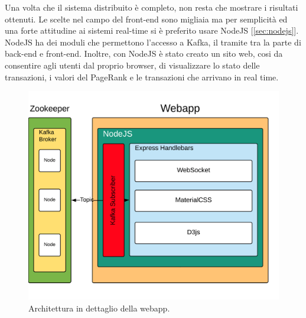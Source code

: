 Una volta che il sistema distribuito è completo, non resta che mostrare i risultati ottenuti. Le scelte nel campo del front-end sono migliaia ma per semplicità ed una forte attitudine ai sistemi real-time si è preferito usare NodeJS [\ref{sec:nodejs}]. NodeJS ha dei moduli che permettono l'accesso a Kafka, il tramite tra la parte di back-end e front-end. Inoltre, con NodeJS è stato creato un sito web, cosi da consentire agli utenti dal proprio browser, di visualizzare lo stato delle transazioni, i valori del PageRank e le transazioni che arrivano in real time.
\begin{figure}[H]
	\centering
	\includegraphics[width=\textwidth]{images/webApp.png}
	\caption{Architettura in dettaglio della webapp.}
	\label{fig:webAppArchitetture}
\end{figure}






